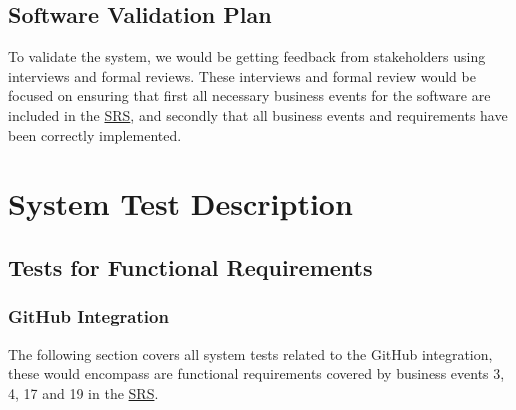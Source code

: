 \documentclass[12pt, titlepage]{article}
\begin{document}
	\subsection{Software Validation Plan}
	
	To validate the system, we would be getting feedback from stakeholders using interviews and formal reviews. These interviews and formal review would be focused on ensuring that first all necessary business events for the software are included in the \href{https://github.com/RutheniumVI/UnderTree/blob/main/docs/SRS/SRS.pdf}{SRS}, and secondly that all business events and requirements have been correctly implemented.
	
	\section{System Test Description}
	
	\subsection{Tests for Functional Requirements}
	
	
	
	
	\subsubsection{GitHub Integration}
	
	The following section covers all system tests related to the GitHub integration, these would encompass are functional requirements covered by business events 3, 4, 17 and 19 in the \href{https://github.com/RutheniumVI/UnderTree/blob/main/docs/SRS/SRS.pdf}{SRS}.
	
	
\end{document}
